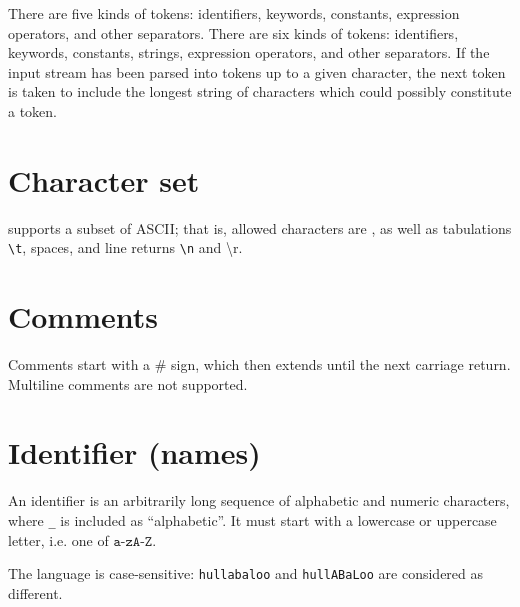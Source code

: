 There are five kinds of tokens: identifiers, keywords, constants, expression operators, and other separators. There are six kinds of tokens: identifiers, keywords, constants, strings, expression operators, and other separators. If the input stream has been parsed into tokens up to a given character, the next token is taken to include the longest string of characters which could possibly constitute a token.

\section{Character set}
\QL supports a subset of ASCII; that is, allowed characters are
, as well as tabulations \texttt{\textbackslash{}t}, spaces, and line returns \texttt{\textbackslash{}n} and {\textbackslash{}r}.
\section{Comments}
Comments start with a \# sign, which then extends until the next carriage return. Multiline comments are not supported.

\section{Identifier (names)}
An identifier is an arbitrarily long sequence of alphabetic and numeric characters, where \texttt{\_} is included as ``alphabetic''. It must start with a lowercase or uppercase letter, i.e. one of $\texttt{a-zA-Z}$.

\noindent The language is case-sensitive: \texttt{hullabaloo} and \texttt{hullABaLoo} are considered as different.
